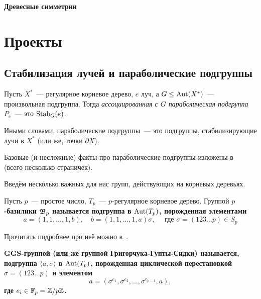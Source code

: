 \documentclass[12pt, oneside, dvipsnames]{extarticle}
\begin{document}
	
	\begin{center}
	{ \Huge \bf{Древесные симметрии} }

	\section*{Проекты}
	\end{center}

	\tableofcontents

	\begin{center}
		\subsection*{Стабилизация лучей и параболические подгруппы}
	\end{center}

	\begin{definition} 
		Пусть $X^*$~--- регулярное корневое дерево, $e$ луч, а $G \le \operatorname{Aut}(X^*)$~--- произвольная подгруппа. Тогда \emph{ассоциированная с $G$ параболическая подгруппа  $P_{e}$}~--- это $\operatorname{Stab}_{G}(e)$. 
	\end{definition}

	Иными словами, параболические подгруппы~--- это подгруппы, стабилизирующие лучи в $X^*$ (или же, точки $\partial X$). 

	Базовые (и несложные) факты про параболические подгруппы изложены в~\cite[стр. 8-9]{bartholdi2001parabolic} (всего несколько страничек).


	Введём несколько важных для нас групп, действующих на корневых деревьях. 

	\begin{definition} 
		Пусть $p$~--- простое число, $T_{p}$~--- $p$-регулярное корневое дерево. Группой \bf{$p$-базилики $\mathfrak{B}_{p}$} называется подгруппа в $\operatorname{Aut}(T_{p})$, порожденная элементами 
		 $$ a = (1,1, \ldots ,1,b), \quad b = (1,1, \ldots ,1,a)\sigma, \quad \text{ где } \sigma = (1 2  3 \ldots p) \in S_{p} $$

		 Прочитать подробнее про неё можно в~\cite{didomenico2021pbasilica}.
	\end{definition}

	\begin{definition} 
		\bf{$\mathbf{GGS}$-группой (или же группой Григорчука-Гупты-Сидки)} называется, подгруппа $\langle a, \sigma \rangle$ в $\operatorname{Aut}(T_{p})$, порожденная циклической перестановкой $\sigma = (123 \ldots p)$  и элементом 
		$$ a = (\sigma^{e_1},\sigma^{e_2},...,\sigma^{e_{p-1}},a), $$
		где $e_i \in \mathbb{F}_{p} = \mathbb{Z}/p\mathbb{Z}$.
	\end{definition}
\end{document}
